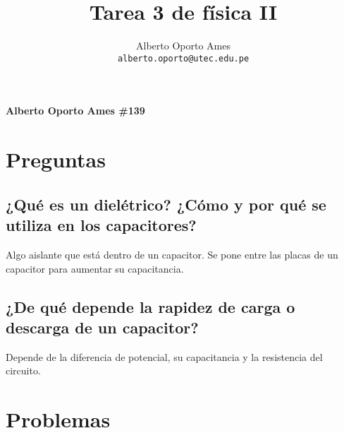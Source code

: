 \documentclass[10pt, twoside]{article}
\title{\textbf{Tarea 3 de física II}}
\author{
		Alberto Oporto Ames\\
		\texttt{alberto.oporto@utec.edu.pe}\\
		}
\begin{document}
\thispagestyle{fancy}

\textbf{Alberto Oporto Ames \#139}

\section*{Preguntas}%

\subsection*{¿Qué es un dielétrico?
¿Cómo y por qué se utiliza en los capacitores?}%
Algo aislante que está dentro de un capacitor.
Se pone entre las placas de un capacitor para aumentar su capacitancia.

\subsection*{¿De qué depende la rapidez de carga o descarga de un capacitor?}%
Depende de la diferencia de potencial, su capacitancia y la resistencia del circuito.

\section*{Problemas}%
\end{document}
